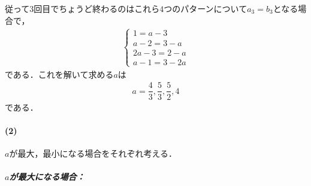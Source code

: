 \documentclass[../../main.tex]{subfiles}
\begin{document}
従って$3$回目でちょうど終わるのはこれら$4$つのパターンについて$a_3=b_3$となる場合で，
\begin{align}
  \begin{cases}
    1 = a-3 \\
    a-2 = 3-a \\
    2a-3 = 2-a \\
    a-1 = 3-2a
  \end{cases}
\end{align}
である．これを解いて求める$a$は
\begin{align}
  a = \dfrac{4}{3},\dfrac{5}{3}, \dfrac{5}{2}, 4
\end{align}
である．

\paragraph{(2)}

$a$が最大，最小になる場合をそれぞれ考える．

\subparagraph{$a$が最大になる場合：}
\end{document}
